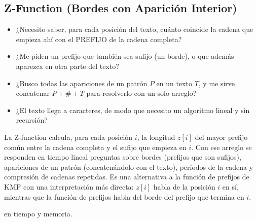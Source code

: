 \subsection{Z-Function (Bordes con Aparición Interior)}
\label{alg:9-8}


\begin{itemize}
\item ¿Necesito saber, para cada posición del texto, cuánto coincide la cadena que empieza ahí con el PREFIJO de la cadena completa?
\item ¿Me piden un prefijo que también sea sufijo (un borde), o que además aparezca en otra parte del texto?
\item ¿Busco todas las apariciones de un patrón $P$ en un texto $T$, y me sirve concatenar $P + \texttt{\#} + T$ para resolverlo con un solo arreglo?
\item ¿El texto llega a  caracteres, de modo que necesito un algoritmo lineal y sin recursión?
\end{itemize}

 La Z-function calcula, para cada posición $i$, la longitud $z[i]$ del mayor prefijo común entre la cadena completa y el sufijo que empieza en $i$. Con ese arreglo se responden en tiempo lineal preguntas sobre bordes (prefijos que son sufijos), apariciones de un patrón (concatenándolo con el texto), períodos de la cadena y compresión de cadenas repetidas. Es una alternativa a la función de prefijos de KMP con una interpretación más directa: $z[i]$ habla de la posición $i$ en sí, mientras que la función de prefijos habla del borde del prefijo que termina en $i$.

  en tiempo y memoria.

